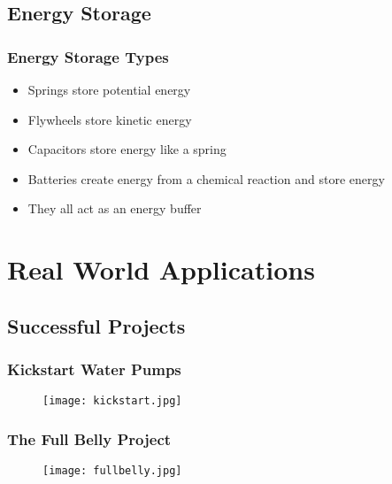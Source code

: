 \documentclass[]{beamer}
\begin{document}
\subsection{Energy Storage}
\frame
{
    \frametitle{Energy Storage Types}
    \begin{itemize}[<+->]
        \item Springs store potential energy 
        \item Flywheels store kinetic energy 
        \item Capacitors store energy like a spring 
        \item Batteries create energy from a chemical reaction and store energy
        \item They all act as an energy buffer
    \end{itemize}
}
\section{Real World Applications}
\subsection{Successful Projects}
\frame
{
    \frametitle{Kickstart Water Pumps}
    \begin{center}
        \begin{figure}[]
            \texttt{[image: kickstart.jpg]}
        \end{figure}
    \end{center}
}
\frame
{
    \frametitle{The Full Belly Project}
    \begin{center}
        \begin{figure}[]
            \texttt{[image: fullbelly.jpg]}
        \end{figure}
    \end{center}
}
\end{document}
